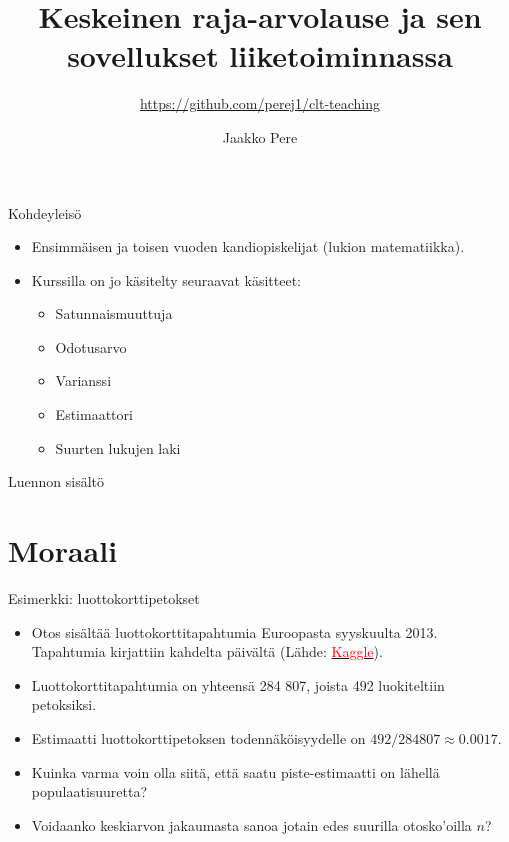 \documentclass{beamer}
\title{Keskeinen raja-arvolause ja sen sovellukset liiketoiminnassa}
\subtitle{\url{https://github.com/perej1/clt-teaching}}
\author{Jaakko Pere}
\date{\displaydate{date}}
\begin{document}
\frame{\titlepage}


\begin{frame}{Kohdeyleisö}
  \begin{itemize}
    \item Ensimmäisen ja toisen vuoden kandiopiskelijat (lukion matematiikka).
    \pause
    \item Kurssilla on jo käsitelty seuraavat käsitteet:
    \begin{itemize}
      \item Satunnaismuuttuja
      \item Odotusarvo
      \item Varianssi
      \item Estimaattori
      \item Suurten lukujen laki
    \end{itemize}
  \end{itemize}
\end{frame}


\begin{frame}{Luennon sisältö}
  \tableofcontents
\end{frame}


\section{Moraali}


\begin{frame}{Esimerkki: luottokorttipetokset}
  \begin{itemize}
    \item Otos sisältää luottokorttitapahtumia Euroopasta syyskuulta 2013.
    Tapahtumia kirjattiin kahdelta päivältä (Lähde:
    \href{https://www.kaggle.com/datasets/mlg-ulb/creditcardfraud?resource=download}{\textcolor{red}{Kaggle}}).
    \pause
    \item Luottokorttitapahtumia on yhteensä 284 807, joista 492 luokiteltiin
    petoksiksi.
    \pause
    \item Estimaatti luottokorttipetoksen todennäköisyydelle on $492 / 284
    807\approx 0.0017$.
    \pause
    \item Kuinka varma voin olla siitä, että saatu piste-estimaatti on lähellä
    populaatisuuretta?
    \pause
    \item Voidaanko keskiarvon jakaumasta sanoa jotain edes suurilla
    otosko'oilla $n$?
  \end{itemize}
\end{frame}
\end{document}
